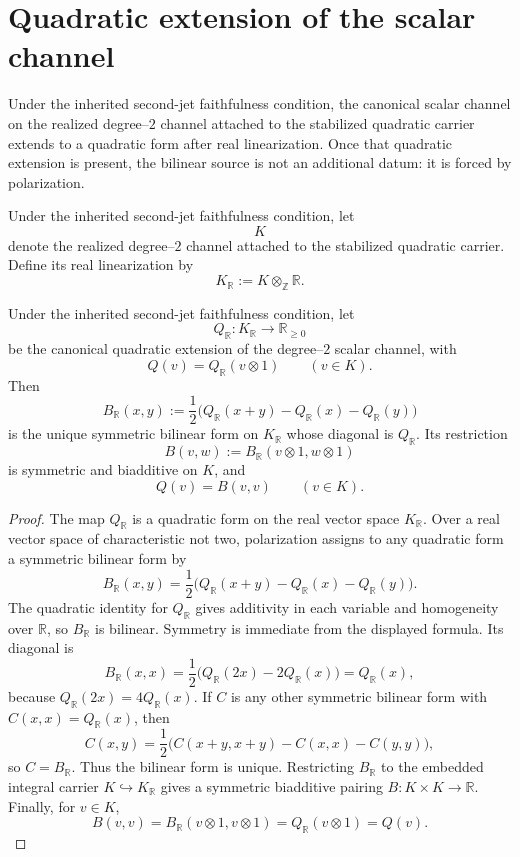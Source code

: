 \section{Quadratic extension of the scalar channel}
\label{sec:quadratic-extension}
Under the inherited second-jet faithfulness condition, the canonical
scalar channel on the realized degree--\(2\) channel attached to the
stabilized quadratic carrier extends to a quadratic form after real
linearization.  Once that quadratic extension is present, the bilinear
source is not an additional datum: it is forced by polarization.
\begin{definition}
	Under the inherited second-jet faithfulness condition, let
	\[
		K
	\]
	denote the realized degree--\(2\) channel attached to the stabilized
	quadratic carrier.  Define its real linearization by
	\[
		K_{\mathbb R}:=K\otimes_{\mathbb Z}\mathbb R.
	\]
\end{definition}
\begin{theorem}
	\label{thm:quadratic-extension}
	\label{thm:scalar-pairing}
	Under the inherited second-jet faithfulness condition, let
	\[
		Q_{\mathbb R}:K_{\mathbb R}\to\mathbb R_{\ge0}
	\]
	be the canonical quadratic extension of the degree--\(2\) scalar
	channel, with
	\[
		Q(v)=Q_{\mathbb R}(v\otimes 1)
		\qquad (v\in K).
	\]
	Then
	\[
		B_{\mathbb R}(x,y)
		:=
		\frac12\bigl(Q_{\mathbb R}(x+y)-Q_{\mathbb R}(x)-Q_{\mathbb R}(y)\bigr)
	\]
	is the unique symmetric bilinear form on
	\(K_{\mathbb R}\) whose diagonal is \(Q_{\mathbb R}\).  Its restriction
	\[
		B(v,w):=B_{\mathbb R}(v\otimes1,w\otimes1)
	\]
	is symmetric and biadditive on \(K\), and
	\[
		Q(v)=B(v,v)
		\qquad (v\in K).
	\]
\end{theorem}
\begin{proof}
	The map \(Q_{\mathbb R}\) is a quadratic form on the real vector space
	\(K_{\mathbb R}\).  Over a real vector space of characteristic not two,
	polarization assigns to any quadratic form a symmetric bilinear form by
	\[
		B_{\mathbb R}(x,y)
		=
		\frac12\bigl(Q_{\mathbb R}(x+y)-Q_{\mathbb R}(x)-Q_{\mathbb R}(y)\bigr).
	\]
	The quadratic identity for \(Q_{\mathbb R}\) gives additivity in each
	variable and homogeneity over \(\mathbb R\), so
	\(B_{\mathbb R}\) is bilinear.  Symmetry is immediate from the displayed
	formula.  Its diagonal is
	\[
		B_{\mathbb R}(x,x)
		=
		\frac12\bigl(Q_{\mathbb R}(2x)-2Q_{\mathbb R}(x)\bigr)
		=
		Q_{\mathbb R}(x),
	\]
	because \(Q_{\mathbb R}(2x)=4Q_{\mathbb R}(x)\).
	If \(C\) is any other symmetric bilinear form with
	\(C(x,x)=Q_{\mathbb R}(x)\), then
	\[
		C(x,y)=\frac12\bigl(C(x+y,x+y)-C(x,x)-C(y,y)\bigr),
	\]
	so \(C=B_{\mathbb R}\).  Thus the bilinear form is unique.
	Restricting \(B_{\mathbb R}\) to the embedded integral carrier
	\(K\hookrightarrow K_{\mathbb R}\) gives a symmetric biadditive pairing
	\(B:K\times K\to\mathbb R\).  Finally, for \(v\in K\),
	\[
		B(v,v)=B_{\mathbb R}(v\otimes1,v\otimes1)
		=Q_{\mathbb R}(v\otimes1)=Q(v).
	\]
\end{proof}
